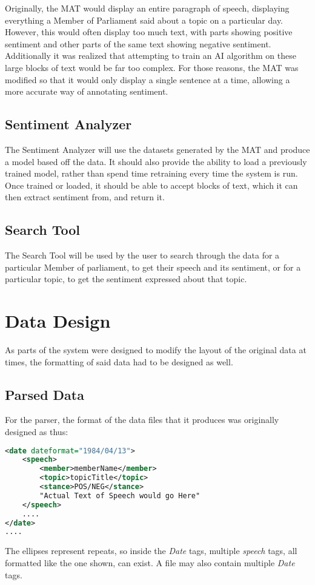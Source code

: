Originally, the MAT would display an entire paragraph of speech, displaying everything a Member of Parliament said about a topic on a particular day. However, this would often display too much text, with parts showing positive sentiment and other parts of the same text showing negative sentiment. Additionally it was realized that attempting to train an AI algorithm on these large blocks of text would be far too complex. For those reasons, the MAT was modified so that it would only display a single sentence at a time, allowing a more accurate way of annotating sentiment.

\subsection{Sentiment Analyzer}
The Sentiment Analyzer will use the datasets generated by the MAT and produce a model based off the data. It should also provide the ability to load a previously trained model, rather than spend time retraining every time the system is run. Once trained or loaded, it should be able to accept blocks of text, which it can then extract sentiment from, and return it.

\subsection{Search Tool}
The Search Tool will be used by the user to search through the data for a particular Member of parliament, to get their speech and its sentiment, or for a particular topic, to get the sentiment expressed about that topic. 

\section{Data Design}
As parts of the system were designed to modify the layout of the original data at times, the formatting of said data had to be designed as well.

\subsection{Parsed Data}
For the parser, the format of the data files that it produces was originally designed as thus:
\begin{lstlisting}[language=XML]
<date dateformat="1984/04/13">	
    <speech>
        <member>memberName</member>
        <topic>topicTitle</topic>
        <stance>POS/NEG</stance>
        "Actual Text of Speech would go Here"
    </speech>
    ....
</date>
....
\end{lstlisting}
The ellipses represent repeats, so inside the \emph{Date} tags, multiple \emph{speech} tags, all formatted like the one shown, can exist. A file may also contain multiple \emph{Date} tags. 

